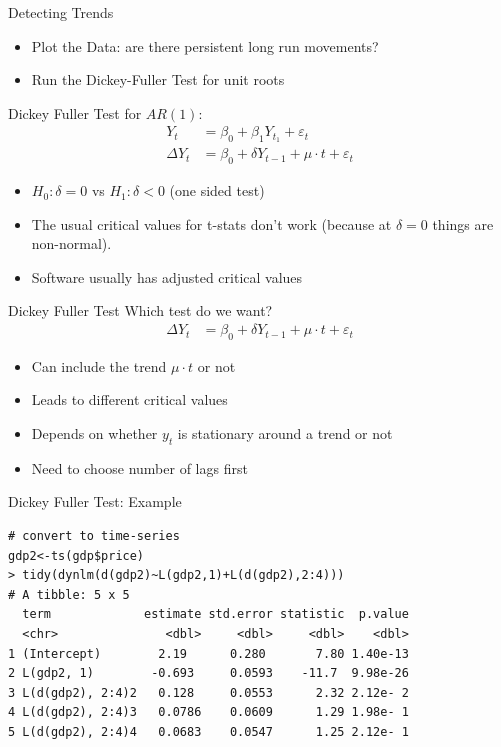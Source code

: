 \documentclass[aspectratio=169]{beamer}
\begin{document}
\begin{frame}{Detecting Trends}
\begin{itemize}
\item Plot the Data: are there persistent long run movements?
\item Run the Dickey-Fuller Test for unit roots
\end{itemize}
Dickey Fuller Test for $AR(1)$:
\begin{align*}
Y_t &= \beta_0 + \beta_1 Y_{t_1} +\varepsilon_t\\
\Delta Y_t &= \beta_0 + \delta Y_{t-1} + \mu \cdot t + \varepsilon_t
\end{align*}
\begin{itemize}
\item $H_0: \delta = 0$ vs $H_1: \delta < 0$ (one sided test)
\item The usual critical values for t-stats don't work (because at $\delta=0$ things are non-normal).
\item Software usually has adjusted critical values
\end{itemize}
\end{frame}


\begin{frame}{Dickey Fuller Test}
Which test do we want?
\begin{align*}
\Delta Y_t &= \beta_0 + \delta Y_{t-1} + \mu \cdot t + \varepsilon_t
\end{align*}
\begin{itemize}
\item Can include the trend $\mu \cdot t$ or not
\item Leads to different critical values
\item Depends on whether $y_t$ is stationary around a trend or not
\item Need to choose number of lags first
\end{itemize}
\end{frame}


\begin{frame}[fragile]{Dickey Fuller Test: Example}
\small
\begin{verbatim}
# convert to time-series
gdp2<-ts(gdp$price)
> tidy(dynlm(d(gdp2)~L(gdp2,1)+L(d(gdp2),2:4)))
# A tibble: 5 x 5
  term             estimate std.error statistic  p.value
  <chr>               <dbl>     <dbl>     <dbl>    <dbl>
1 (Intercept)        2.19      0.280       7.80 1.40e-13
2 L(gdp2, 1)        -0.693     0.0593    -11.7  9.98e-26
3 L(d(gdp2), 2:4)2   0.128     0.0553      2.32 2.12e- 2
4 L(d(gdp2), 2:4)3   0.0786    0.0609      1.29 1.98e- 1
5 L(d(gdp2), 2:4)4   0.0683    0.0547      1.25 2.12e- 1
\end{verbatim}
\end{frame}
\end{document}
